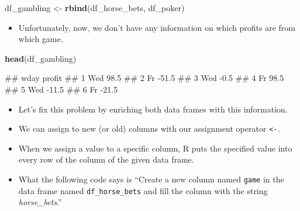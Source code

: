 \documentclass[
]{book}
\newenvironment{Shaded}{\begin{snugshade}}{\end{snugshade}}
\newcommand{\FunctionTok}[1]{\textcolor[rgb]{0.13,0.29,0.53}{\textbf{#1}}}
\newcommand{\NormalTok}[1]{#1}
\newcommand{\OtherTok}[1]{\textcolor[rgb]{0.56,0.35,0.01}{#1}}
\newcommand{\SpecialCharTok}[1]{\textcolor[rgb]{0.81,0.36,0.00}{\textbf{#1}}}
\newcommand{\StringTok}[1]{\textcolor[rgb]{0.31,0.60,0.02}{#1}}
\providecommand{\tightlist}{%
  \setlength{\itemsep}{0pt}\setlength{\parskip}{0pt}}
\begin{document}
\begin{Shaded}
\begin{Highlighting}[]
\NormalTok{df\_gambling }\OtherTok{\textless{}{-}} \FunctionTok{rbind}\NormalTok{(df\_horse\_bets, df\_poker)}
\end{Highlighting}
\end{Shaded}

\begin{itemize}
\tightlist
\item
  Unfortunately, now, we don't have any information on which profits are from which game.
\end{itemize}

\begin{Shaded}
\begin{Highlighting}[]
\FunctionTok{head}\NormalTok{(df\_gambling)}
\end{Highlighting}
\end{Shaded}

\begin{Shaded}
\begin{Highlighting}[]
\NormalTok{\#\#   wday profit}
\NormalTok{\#\# 1  Wed   98.5}
\NormalTok{\#\# 2   Fr  {-}51.5}
\NormalTok{\#\# 3  Wed   {-}0.5}
\NormalTok{\#\# 4   Fr   98.5}
\NormalTok{\#\# 5  Wed  {-}11.5}
\NormalTok{\#\# 6   Fr  {-}21.5}
\end{Highlighting}
\end{Shaded}

\begin{itemize}
\tightlist
\item
  Let's fix this problem by enriching both data frames with this information.
\item
  We can assign to new (or old) columns with our assignment operator \texttt{\textless{}-}.
\item
  When we assign a value to a specific column, R puts the specified value into every row of the column of the given data frame.
\item
  What the following code says is ``Create a new column named \texttt{game} in the data frame named \texttt{df\_horse\_bets} and fill the column with the string \emph{horse\_bets}.''
\end{itemize}

\begin{Shaded}
\end{Shaded}
\end{document}
